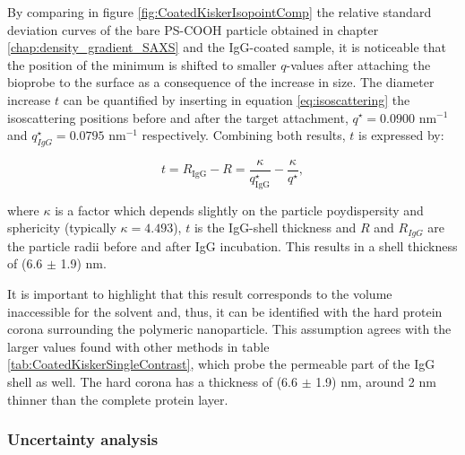 By comparing in figure \ref{fig:CoatedKiskerIsopointComp} the relative standard deviation curves of the bare PS-COOH particle obtained in chapter \ref{chap:density_gradient_SAXS} and the IgG-coated sample, it is noticeable that the position of the minimum is shifted to smaller $q$-values after attaching the bioprobe to the surface as a consequence of the increase in size. The diameter increase $t$ can be quantified by inserting in equation \ref{eq:isoscattering} the isoscattering positions before and after the target attachment, $q^{\star}=0.0900$ nm$^{-1}$ and $q^{\star}_{IgG}=0.0795$ nm$^{-1}$ respectively. Combining both results, $t$ is expressed by:


\begin{equation}
t = R_{\text{IgG}} - R = \frac{\kappa}{q^{\star}_{\text{IgG}}}-\frac{\kappa}{q^{\star}} ,
\label{eq:IsopointRadiusDifference}
\end{equation}

where $\kappa$ is a factor which depends slightly on the particle poydispersity and sphericity (typically $\kappa = 4.493$), $t$ is the IgG-shell thickness and $R$ and $R_{IgG}$ are the particle radii before and after IgG incubation. This results in a shell thickness of (6.6 $\pm$ 1.9) nm. 

It is important to highlight that this result corresponds to the volume inaccessible for the solvent and, thus, it can be identified with the hard protein corona surrounding the polymeric nanoparticle. This assumption agrees with the larger values found with other methods in table \ref{tab:CoatedKiskerSingleContrast}, which probe the permeable part of the IgG shell as well. The hard corona has a thickness of (6.6 $\pm$ 1.9) nm, around 2 nm thinner than the complete protein layer.

\subsubsection{Uncertainty analysis}


